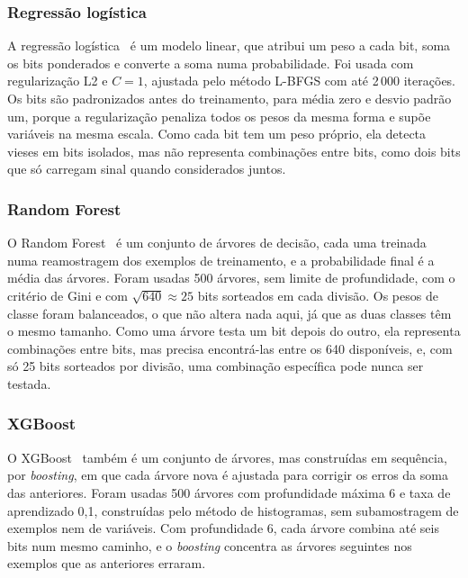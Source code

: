 \subsubsection{Regressão logística}

A regressão logística~\cite{Cox1958} é um modelo linear, que atribui um peso a cada bit, soma os bits ponderados e converte a soma numa probabilidade. Foi usada com regularização L2 e $C = 1$, ajustada pelo método L-BFGS com até 2\,000 iterações. Os bits são padronizados antes do treinamento, para média zero e desvio padrão um, porque a regularização penaliza todos os pesos da mesma forma e supõe variáveis na mesma escala. Como cada bit tem um peso próprio, ela detecta vieses em bits isolados, mas não representa combinações entre bits, como dois bits que só carregam sinal quando considerados juntos.

\subsubsection{Random Forest}

O Random Forest~\cite{Breiman2001} é um conjunto de árvores de decisão, cada uma treinada numa reamostragem dos exemplos de treinamento, e a probabilidade final é a média das árvores. Foram usadas 500 árvores, sem limite de profundidade, com o critério de Gini e com $\sqrt{640} \approx 25$ bits sorteados em cada divisão. Os pesos de classe foram balanceados, o que não altera nada aqui, já que as duas classes têm o mesmo tamanho. Como uma árvore testa um bit depois do outro, ela representa combinações entre bits, mas precisa encontrá-las entre os 640 disponíveis, e, com só 25 bits sorteados por divisão, uma combinação específica pode nunca ser testada.

\subsubsection{XGBoost}

O XGBoost~\cite{ChenGuestrin2016} também é um conjunto de árvores, mas construídas em sequência, por \textit{boosting}, em que cada árvore nova é ajustada para corrigir os erros da soma das anteriores. Foram usadas 500 árvores com profundidade máxima 6 e taxa de aprendizado 0,1, construídas pelo método de histogramas, sem subamostragem de exemplos nem de variáveis. Com profundidade 6, cada árvore combina até seis bits num mesmo caminho, e o \textit{boosting} concentra as árvores seguintes nos exemplos que as anteriores erraram.

